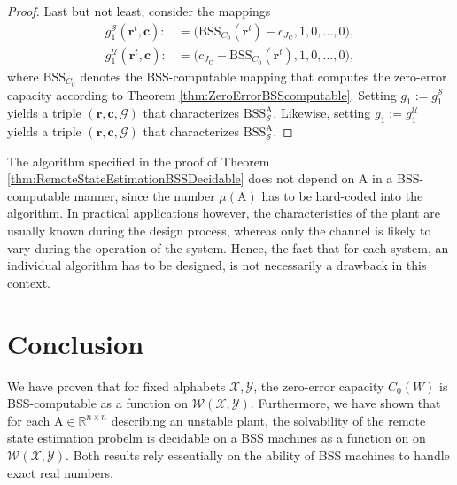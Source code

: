 \documentclass[conference]{IEEEtran}
\def\X{{\mathcal X}}
\def\Y{{\mathcal Y}}
\def\G{{\mathcal G}}
\def\W{{\mathcal W}}
\def\S{{\mathcal S}}
\def\U{{\mathcal U}}
\def\RR{{\mathbb R}}
\def\mA{\bm{\mathrm{A}}}
\newcommand{\BSS}{\mathrm{BSS}}
\begin{document}
\begin{proof}
					Last but not least, consider the mappings
					\begin{align*}	g_1^\S(\bm{r}^t,\bm{c}) :&= \big(\BSS_{C_0}(\bm{r}^t) - c_{J_\mathrm{C}}, 1, 0, \ldots, 0\big), \\
									g_1^\U(\bm{r}^t,\bm{c}) :&= \big(c_{J_\mathrm{C}} - \BSS_{C_0}(\bm{r}^t), 1, 0, \ldots, 0\big), 
					\end{align*}
					where \(\BSS_{C_0}\) denotes the BSS-computable mapping that computes the zero-error capacity according to Theorem \ref{thm:ZeroErrorBSScomputable}. 
					Setting \(g_1 := g_1^\S\) yields a triple \((\bm{r}, \bm{c}, \G)\)
					that characterizes \(\BSS_{\S}^{\mA}\). Likewise, setting \(g_1 := g_1^\U\) yields a triple \((\bm{r}, \bm{c}, \G)\)
					that characterizes \(\BSS_{\S}^{\mA}\).
	\end{proof}
	
	The algorithm specified in the proof of Theorem \ref{thm:RemoteStateEstimationBSSDecidable} does not depend on \(\mA\) in a BSS-computable manner,
	since the number \(\mu(\mA)\) has to be hard-coded into the algorithm. In practical applications however, the characteristics of the plant
	are usually known during the design process, whereas only the channel is likely to vary during the operation
	of the system. Hence, the fact that for each system, an individual algorithm has to be designed, is not necessarily a drawback in this context.
	
\section{Conclusion}	\label{sec:Conclusion}
	We have proven that for fixed alphabets \(\X,\Y\), the zero-error capacity \(C_0(W)\) is BSS-computable as a function on \(\W(\X,\Y)\).
	Furthermore, we have shown that for each \(\mA\in \RR^{n\times n}\) describing an unstable plant, the solvability of the remote state estimation
	probelm is decidable on a BSS machines as a function on on \(\W(\X,\Y)\). Both results rely essentially on the ability of BSS machines to handle exact real numbers.
		



\end{document}
